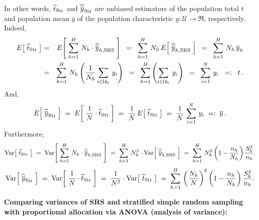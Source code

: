 \documentclass{article}
\begin{document}
In other words, $\widehat{t}_{\textnormal{Str}}$ and $\widehat{\overline{y}}_{\textnormal{Str}}$ are unbiased estimators of the population total $t$ and population mean $\overline{y}$ of the population characteristic $y : \mathcal{U} \longrightarrow \Re$, respectively.  Indeed,
\begin{eqnarray*}
            E\!\left[\;\widehat{t}_{\textnormal{Str}}\;\right]
    &=&  E\!\left[\; \sum^{H}_{h=1}\, N_{h}\cdot\widehat{\overline{y}}_{h,\textnormal{SRS}} \;\right]
    \;\;=\;\;  \sum^{H}_{h=1}\, N_{h}\,E\!\left[\; \widehat{\overline{y}}_{h,\textnormal{SRS}} \;\right]
    \;\;=\;\;  \sum^{H}_{h=1}\, N_{h}\,\overline{y}_{h} \\
    &=& \sum^{H}_{h=1}\, N_{h}\left(\dfrac{1}{N_{h}}\sum_{i\in\mathcal{U}_{h}}\,y_{i}\right)
    \;\;=\;\;  \sum^{H}_{h=1}   \left(\sum_{i\in\mathcal{U}_{h}}\,y_{i}\right)
    \;\;=\;\;  \sum^{N}_{i=1}\,y_{i}
    \;\;=:\;\; t\,.
\end{eqnarray*}
And,
\begin{equation*}
           E\!\left[\;\widehat{\overline{y}}_{\textnormal{Str}}\;\right]
   \;=\;  E\!\left[\;\dfrac{1}{N}\cdot\widehat{t}_{\textnormal{Str}}\;\right]
   \;=\;  \dfrac{1}{N}\,E\!\left[\;\widehat{t}_{\textnormal{Str}}\;\right]
   \;=\;  \dfrac{1}{N}\,\sum^{N}_{i=1}\,y_{i}
   \;=:\; \overline{y}\,.
\end{equation*}
Furthermore,
\begin{equation*}
             \textnormal{Var}\!\left[\;\widehat{t}_{\textnormal{Str}}\;\right]
    \;=\;  \textnormal{Var}\!\left[\; \sum^{H}_{h=1}\, N_{h}\cdot\widehat{\overline{y}}_{h,\textnormal{SRS}} \;\right]
    \;=\;  \sum^{H}_{h=1}\, N_{h}^{2}\cdot\textnormal{Var}\!\left[\; \widehat{\overline{y}}_{h,\textnormal{SRS}} \;\right]
    \;=\;  \sum^{H}_{h=1}\, N_{h}^{2}\left(1-\dfrac{n_{h}}{N_{h}}\right)\dfrac{S^{2}_{h}}{n_{h}}.
\end{equation*}
\begin{equation*}
             \textnormal{Var}\!\left[\;\widehat{\overline{y}}_{\textnormal{Str}}\;\right]
    \;=\;  \textnormal{Var}\!\left[\; \dfrac{1}{N}\cdot\widehat{t}_{\textnormal{Str}} \;\right]
    \;=\;  \dfrac{1}{N^{2}}\cdot\textnormal{Var}\!\left[\; \widehat{t}_{\textnormal{Str}} \;\right]
    \;=\;  \sum^{H}_{h=1}\, \left(\dfrac{N_{h}}{N}\right)^{2}\left(1-\dfrac{n_{h}}{N_{h}}\right)\dfrac{S^{2}_{h}}{n_{h}}.
\end{equation*}

\noindent
\textbf{Comparing variances of SRS and stratified simple random sampling with proportional allocation via ANOVA (analysis of variance):}
\end{document}
